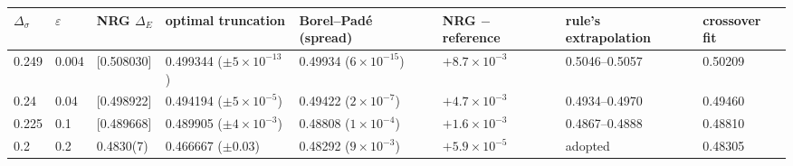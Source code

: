 \begin{tabular}{@{}llllllll@{}}
\toprule
$\Delta_\sigma$ & $\varepsilon$ & NRG $\Delta_E$ & optimal truncation & Borel--Pad\'e (spread) & NRG $-$ reference & rule's extrapolation & crossover fit\\
\midrule
0.249 & 0.004 & [0.508030] & 0.499344 ($\pm5\times10^{-13}$) & 0.49934 ($6\times10^{-15}$) & $+8.7\times10^{-3}$ & 0.5046--0.5057 & 0.50209\\
0.24 & 0.04 & [0.498922] & 0.494194 ($\pm5\times10^{-5}$) & 0.49422 ($2\times10^{-7}$) & $+4.7\times10^{-3}$ & 0.4934--0.4970 & 0.49460\\
0.225 & 0.1 & [0.489668] & 0.489905 ($\pm4\times10^{-3}$) & 0.48808 ($1\times10^{-4}$) & $+1.6\times10^{-3}$ & 0.4867--0.4888 & 0.48810\\
0.2 & 0.2 & 0.4830(7) & 0.466667 ($\pm0.03$) & 0.48292 ($9\times10^{-3}$) & $+5.9\times10^{-5}$ & adopted & 0.48305\\
\bottomrule
\end{tabular}
